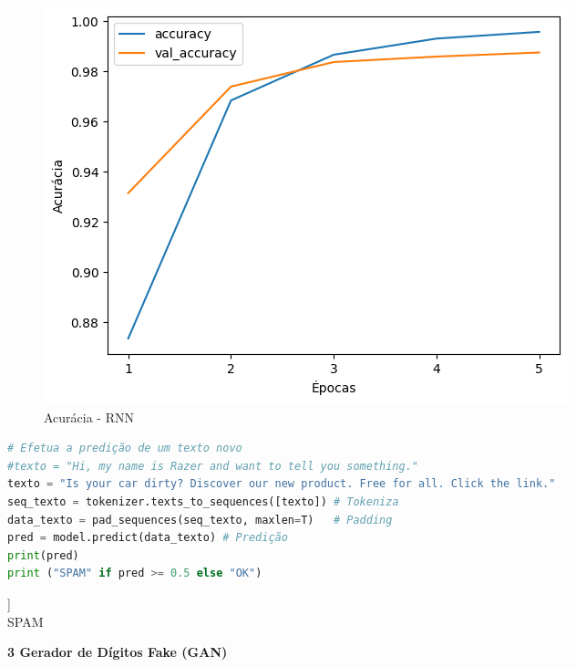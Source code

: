 \begin{figure}[H]
\centering
\includegraphics[width=.8\linewidth]{apendices/fig/9_IAA009_6.png}
\caption{Acurácia - RNN}
\end{figure}

\begin{lstlisting}[language=Python, style=input]
# Efetua a predição de um texto novo
#texto = "Hi, my name is Razer and want to tell you something."
texto = "Is your car dirty? Discover our new product. Free for all. Click the link."
seq_texto = tokenizer.texts_to_sequences([texto]) # Tokeniza
data_texto = pad_sequences(seq_texto, maxlen=T)   # Padding
pred = model.predict(data_texto) # Predição
print(pred)
print ("SPAM" if pred >= 0.5 else "OK")
\end{lstlisting}

\begin{tcolorbox}[myoutputstyle]
[[0.7768526]]\\
SPAM
\end{tcolorbox}


\begin{adjustwidth}{1em}{}
\textbf{3 Gerador de Dígitos Fake (GAN)}
\end{adjustwidth}


